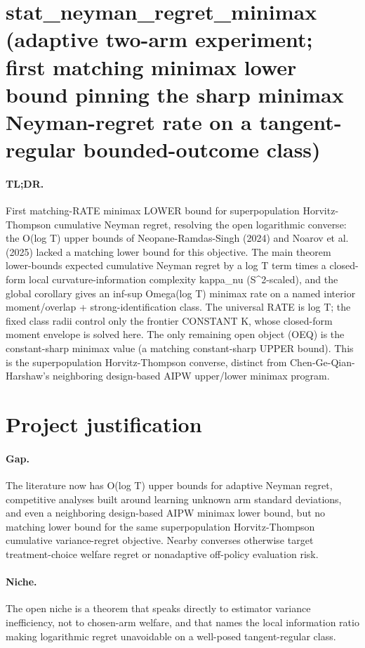 \documentclass{article}
\begin{document}
\section*{stat_neyman_regret_minimax (adaptive two-arm experiment; first matching minimax lower bound pinning the sharp minimax Neyman-regret rate on a tangent-regular bounded-outcome class)}

\paragraph{TL;DR.} First matching-RATE minimax LOWER bound for superpopulation Horvitz-Thompson cumulative Neyman regret, resolving the open logarithmic converse: the O(log T) upper bounds of Neopane-Ramdas-Singh (2024) and Noarov et al. (2025) lacked a matching lower bound for this objective. The main theorem lower-bounds expected cumulative Neyman regret by a log T term times a closed-form local curvature-information complexity kappa_nu (S^2-scaled), and the global corollary gives an inf-sup Omega(log T) minimax rate on a named interior moment/overlap + strong-identification class. The universal RATE is log T; the fixed class radii control only the frontier CONSTANT K, whose closed-form moment envelope is solved here. The only remaining open object (OEQ) is the constant-sharp minimax value (a matching constant-sharp UPPER bound). This is the superpopulation Horvitz-Thompson converse, distinct from Chen-Ge-Qian-Harshaw's neighboring design-based AIPW upper/lower minimax program.

\section{Project justification}

\paragraph{Gap.} The literature now has O(log T) upper bounds for adaptive Neyman regret, competitive analyses built around learning unknown arm standard deviations, and even a neighboring design-based AIPW minimax lower bound, but no matching lower bound for the same superpopulation Horvitz-Thompson cumulative variance-regret objective. Nearby converses otherwise target treatment-choice welfare regret or nonadaptive off-policy evaluation risk.

\paragraph{Niche.} The open niche is a theorem that speaks directly to estimator variance inefficiency, not to chosen-arm welfare, and that names the local information ratio making logarithmic regret unavoidable on a well-posed tangent-regular class.
\end{document}
